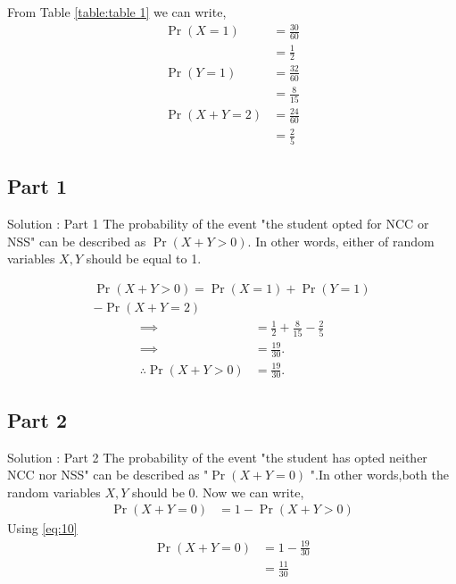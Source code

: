 \documentclass{beamer}
\providecommand{\pr}[1]{\ensuremath{\Pr\left(#1\right)}}
\begin{document}
        From Table \ref{table:table 1} we can write,
          \begin{align}
               \pr{X = 1} &= \frac{30}{60} \\
                               &=\frac{1}{2}\\
               \pr{Y = 1} &= \frac{32}{60} \\
                               &= \frac{8}{15}\label{eq:4}\\
               \pr{X + Y = 2} &= \frac{24}{60}\\
                                     &= \frac{2}{5}\label{eq:6}
          \end{align}
 \subsection{Part 1}
     
\begin{frame}{Solution : Part 1}
      The probability of the event "the student opted for NCC or NSS" can be described as $\pr{X + Y >0}$. In other words, either of random variables 
                $X,Y$ should be equal to 1.
                  
                   \begin{equation}
                   \begin{split}
                      \pr{X+Y>0} = \pr{X=1}+\pr{Y=1}\\
                                             -\pr{X+Y=2}
                    \end{split}
                   \end{equation}
                  \begin{align}
                        \implies      &= \frac{1}{2} + \frac{8}{15}  - \frac{2}{5}\\
                        \implies      &= \frac{19}{30}.\\
                    \therefore \pr{X+Y>0} &= \frac{19}{30}.\label{eq:10}
                    \end{align}
\end{frame} 
\subsection{Part 2}

\begin{frame}{Solution : Part 2}
       The probability of the event "the student has opted neither NCC nor NSS" can be described as "$\pr{X + Y =0}$ ".In other words,both the random variables $X,Y$ should be 0.  
                 Now we can write,
                 \begin{align}
                   \pr{X + Y = 0} &= 1 - \pr{X + Y >0}
                 \end{align}
                Using \eqref{eq:10}
                 \begin{align}
	           \pr{X + Y = 0} &= 1 - \frac{19}{30}\\
                                         &= \frac{11}{30}                        
                 \end{align}
\end{frame}
\end{document}

